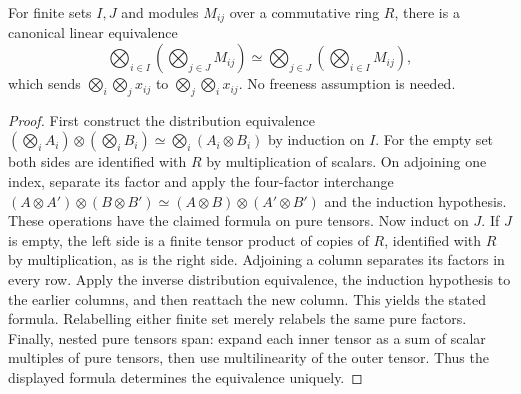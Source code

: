 \begin{lemma}
\label{lem:tensor-regrouping}
\leanok
For finite sets $I,J$ and modules $M_{ij}$ over a commutative ring $R$,
there is a canonical linear equivalence
\[
 \bigotimes_{i\in I}\left(\bigotimes_{j\in J}M_{ij}\right)
 \simeq
 \bigotimes_{j\in J}\left(\bigotimes_{i\in I}M_{ij}\right),
\]
which sends $\bigotimes_i\bigotimes_j x_{ij}$ to
$\bigotimes_j\bigotimes_i x_{ij}$. No freeness assumption is needed.
\end{lemma}
\begin{proof}
First construct the distribution equivalence
$(\bigotimes_i A_i)\otimes(\bigotimes_i B_i)
\simeq\bigotimes_i(A_i\otimes B_i)$ by induction on $I$.
For the empty set both sides are identified with $R$ by multiplication
of scalars. On adjoining one index, separate its factor and apply the
four-factor interchange
$(A\otimes A')\otimes(B\otimes B')\simeq
(A\otimes B)\otimes(A'\otimes B')$ and the induction hypothesis.
These operations have the claimed formula on pure tensors.
Now induct on $J$. If $J$ is empty, the left side is a finite tensor
product of copies of $R$, identified with $R$ by multiplication, as
is the right side. Adjoining a column separates its factors in every
row. Apply the inverse distribution equivalence, the induction
hypothesis to the earlier columns, and then reattach the new column.
This yields the stated formula. Relabelling either finite set merely
relabels the same pure factors. Finally, nested pure tensors span:
expand each inner tensor as a sum of scalar multiples of pure tensors,
then use multilinearity of the outer tensor. Thus the displayed
formula determines the equivalence uniquely.
\end{proof}

